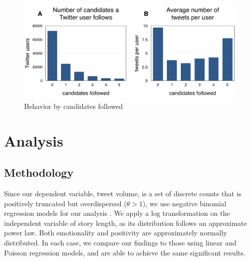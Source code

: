 \documentclass[letterpaper]{article}
\begin{document}
\begin{figure}[t!] 
\centering  
  \includegraphics[width=\columnwidth]{levels-of-engagement-charts}  
  \caption{Behavior by candidates followed
    \label{fig:levels-of-engagement-charts}}
\end{figure} 

\section{Analysis}  
\subsection{Methodology}
Since our dependent variable, tweet volume, is a set of discrete counts that is positively truncated but overdispersed ($\theta > 1$), we use negative binomial regression models for our analysis \cite{scott1997regression}. We apply a log transformation on the independent variable of story length, as its distribution follows an approximate power law. Both emotionality and positivity are approximately normally distributed. In each case, we compare our findings to those using linear and Poisson regression models, and are able to achieve the same significant results. 
 
\end{document}
